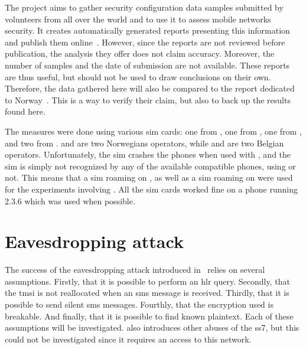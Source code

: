     The  project aims to gather security configuration
    data samples submitted by volunteers from all over the world and to
    use it to assess mobile networks security. It creates automatically
    generated reports presenting this information and publish them
    online~\cite{security_research_labs_gsm_????}. However, since the
    reports are not reviewed before publication, the analysis they offer
    does not claim accuracy. Moreover, the number of samples and the
    date of submission are not available. These reports are thus useful,
    but should not be used to draw conclusions on their own. Therefore,
    the data gathered here will also be compared to the 
    report dedicated to
    Norway~\cite{security_research_labs_mobile_2015}. This is a way to
    verify their claim, but also to back up the results found here.

    The measures were done using various \gls{sim} cards: one from
    , one from , one from , and
    two from .  and  are two
    Norwegians operators, while  and  are two
    Belgian operators. Unfortunately, the  \gls{sim}
    crashes the phones when used with , and the
     \gls{sim} is simply not recognized by any of the
    available compatible phones, using  or not. This
    means that a  \gls{sim} roaming on , as
    well as a  \gls{sim} roaming on  were used
    for the experiments involving . All the \gls{sim}
    cards worked fine on a  phone running
     $2.3.6$ which was used when possible.

  \section{Eavesdropping attack}

    The success of the eavesdropping attack introduced
    in~ relies on several assumptions.
    Firstly, that it is possible to perform an \gls{hlr} query.
    Secondly, that the \gls{tmsi} is not reallocated when an \gls{sms}
    message is received. Thirdly, that it is possible to send silent
    \gls{sms} messages. Fourthly, that the encryption used is breakable.
    And finally, that it is possible to find known plaintext. Each of
    these assumptions will be investigated.
     also introduces other abuses of
    the \gls{ss7}, but this could not be investigated since it requires
    an access to this network. 


